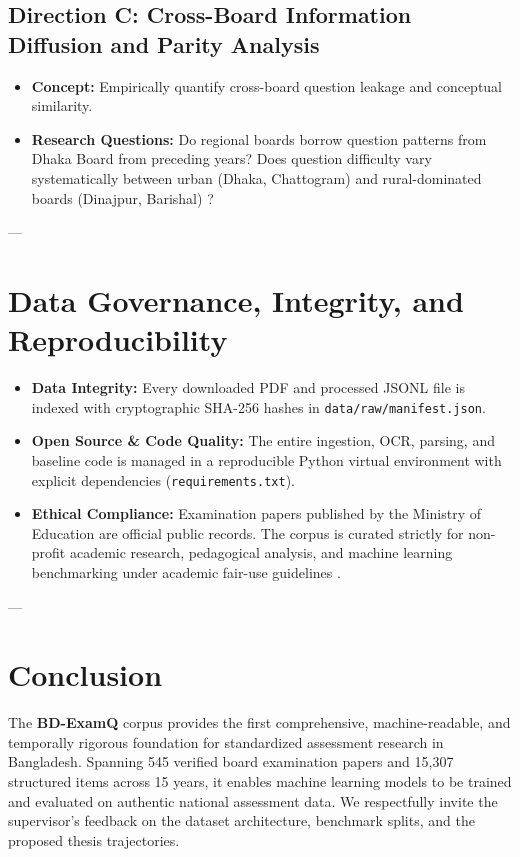 \documentclass[11pt,a4paper]{article}
\begin{document}
\subsection{Direction C: Cross-Board Information Diffusion and Parity Analysis}
\begin{itemize}[noitemsep,topsep=2pt]
    \item \textbf{Concept:} Empirically quantify cross-board question leakage and conceptual similarity.
    \item \textbf{Research Questions:} Do regional boards borrow question patterns from Dhaka Board from preceding years? Does question difficulty vary systematically between urban (Dhaka, Chattogram) and rural-dominated boards (Dinajpur, Barishal) \cite{unesco2019bangladesh}?
\end{itemize}

---

\section{Data Governance, Integrity, and Reproducibility}
\label{sec:governance}

\begin{itemize}[noitemsep,topsep=2pt]
    \item \textbf{Data Integrity:} Every downloaded PDF and processed JSONL file is indexed with cryptographic SHA-256 hashes in \texttt{data/raw/manifest.json}.
    \item \textbf{Open Source \& Code Quality:} The entire ingestion, OCR, parsing, and baseline code is managed in a reproducible Python virtual environment with explicit dependencies (\texttt{requirements.txt}).
    \item \textbf{Ethical Compliance:} Examination papers published by the Ministry of Education are official public records. The corpus is curated strictly for non-profit academic research, pedagogical analysis, and machine learning benchmarking under academic fair-use guidelines \cite{gebru2021datasheets}.
\end{itemize}

---

\section{Conclusion}
\label{sec:conclusion}
The \textbf{BD-ExamQ} corpus provides the first comprehensive, machine-readable, and temporally rigorous foundation for standardized assessment research in Bangladesh. Spanning 545 verified board examination papers and 15,307 structured items across 15 years, it enables machine learning models to be trained and evaluated on authentic national assessment data. We respectfully invite the supervisor's feedback on the dataset architecture, benchmark splits, and the proposed thesis trajectories.
\end{document}
